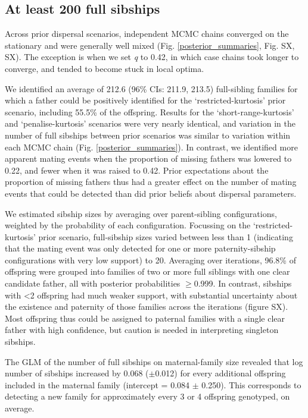 \documentclass[10pt, a4paper, twocolumn]{article} %
\begin{document}
\subsection{At least 200 full sibships}

Across prior dispersal scenarios, independent MCMC chains converged on the stationary and were generally well mixed (Fig. \ref{posterior_summaries}, Fig. SX, SX). The exception is when we set \textit{q} to 0.42, in which case chains took longer to converge, and tended to become stuck in local optima.

We identified an average of 212.6 (96\% CIs: 211.9, 213.5) full-sibling families for which a father could be positively identified for the ‘restricted-kurtosis’ prior scenario, including 55.5\% of the offspring. Results for the ‘short-range-kurtosis’ and ‘penalise-kurtosis’ scenarios were very nearly identical, and variation in the number of full sibships between prior scenarios was similar to variation within each MCMC chain (Fig. \ref{posterior_summaries}). In contrast, we identified more apparent mating events when the proportion of missing fathers was lowered to 0.22, and fewer when it was raised to 0.42. Prior expectations about the proportion of missing fathers thus had a greater effect on the number of mating events that could be detected than did prior beliefs about dispersal parameters.

We estimated sibship sizes by averaging over parent-sibling configurations, weighted by the probability of each configuration. Focussing on the ‘restricted-kurtosis’ prior scenario, full-sibship sizes varied between less than 1 (indicating that the mating event was only detected for one or more paternity-sibship configurations with very low support) to 20. Averaging over iterations, 96.8\% of offspring were grouped into families of two or more full siblings with one clear candidate father, all with posterior probabilities $\geq$0.999. In contrast, sibships with <2 offspring had much weaker support, with substantial uncertainty about the existence and paternity of those families across the iterations (figure SX). Most offspring thus could be assigned to paternal families with a single clear father with high confidence, but caution is needed in interpreting singleton sibships.

The GLM of the number of full sibships on maternal-family size revealed that log number of sibships increased by 0.068 ($\pm$0.012) for every additional offspring included in the maternal family (intercept = 0.084 $\pm$ 0.250). This corresponds to detecting a new family for approximately every 3 or 4 offspring genotyped, on average.
\end{document}
